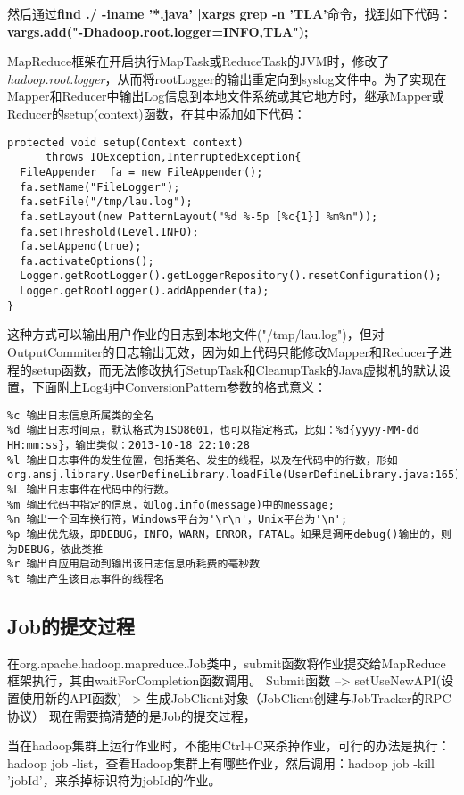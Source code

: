 然后通过\textbf{find ./ -iname '*.java' |xargs grep -n 'TLA'}命令，找到如下代码：\textbf{vargs.add("-Dhadoop.root.logger=INFO,TLA");}
\par MapReduce框架在开启执行MapTask或ReduceTask的JVM时，修改了\textsl{hadoop.root.logger}，从而将rootLogger的输出重定向到syslog文件中。为了实现在Mapper和Reducer中输出Log信息到本地文件系统或其它地方时，继承Mapper或Reducer的setup(context)函数，在其中添加如下代码：
\begin{verbatim}
protected void setup(Context context) 
      throws IOException,InterruptedException{
  FileAppender  fa = new FileAppender();
  fa.setName("FileLogger");
  fa.setFile("/tmp/lau.log");
  fa.setLayout(new PatternLayout("%d %-5p [%c{1}] %m%n"));
  fa.setThreshold(Level.INFO);
  fa.setAppend(true);
  fa.activateOptions();
  Logger.getRootLogger().getLoggerRepository().resetConfiguration();
  Logger.getRootLogger().addAppender(fa);
}
\end{verbatim}
\par 这种方式可以输出用户作业的日志到本地文件("/tmp/lau.log")，但对OutputCommiter的日志输出无效，因为如上代码只能修改Mapper和Reducer子进程的setup函数，而无法修改执行SetupTask和CleanupTask的Java虚拟机的默认设置，下面附上Log4j中ConversionPattern参数的格式意义：
\begin{verbatim}
%c 输出日志信息所属类的全名
%d 输出日志时间点，默认格式为ISO8601，也可以指定格式，比如：%d{yyyy-MM-dd HH:mm:ss}，输出类似：2013-10-18 22:10:28
%l 输出日志事件的发生位置，包括类名、发生的线程，以及在代码中的行数，形如org.ansj.library.UserDefineLibrary.loadFile(UserDefineLibrary.java:165)。
%L 输出日志事件在代码中的行数。
%m 输出代码中指定的信息，如log.info(message)中的message;
%n 输出一个回车换行符，Windows平台为'\r\n'，Unix平台为'\n';
%p 输出优先级，即DEBUG，INFO，WARN，ERROR，FATAL。如果是调用debug()输出的，则为DEBUG，依此类推
%r 输出自应用启动到输出该日志信息所耗费的毫秒数
%t 输出产生该日志事件的线程名
\end{verbatim}
\subsection{Job的提交过程}
在org.apache.hadoop.mapreduce.Job类中，submit函数将作业提交给MapReduce框架执行，其由waitForCompletion函数调用。
Submit函数 --> setUseNewAPI(设置使用新的API函数) --> 生成JobClient对象（JobClient创建与JobTracker的RPC协议）
现在需要搞清楚的是Job的提交过程，
\par 当在hadoop集群上运行作业时，不能用Ctrl+C来杀掉作业，可行的办法是执行：hadoop job -list，查看Hadoop集群上有哪些作业，然后调用：hadoop job -kill 'jobId'，来杀掉标识符为jobId的作业。
